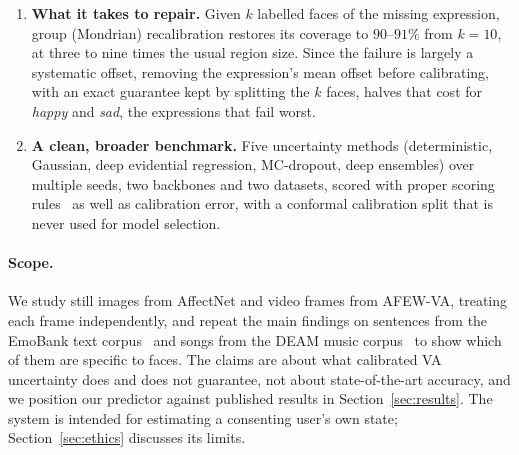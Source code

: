 \begin{enumerate}
        contempt looks like the happy and neutral faces the model has seen. This
        is a concrete, reproducible instance of the limits of distribution-free
        inference~\cite{barber2021limits} in affect.
  \item \textbf{What it takes to repair.} Given $k$ labelled faces of the
        missing expression, group (Mondrian) recalibration restores its
        coverage to $90$--$91\%$ from $k=10$, at three to nine times the usual
        region size. Since the failure is largely a systematic offset, removing
        the expression's mean offset before calibrating, with an exact guarantee
        kept by splitting the $k$ faces, halves that cost for \emph{happy} and
        \emph{sad}, the expressions that fail worst.
  \item \textbf{A clean, broader benchmark.} Five uncertainty methods
        (deterministic, Gaussian, deep evidential regression, MC-dropout, deep
        ensembles) over multiple seeds, two backbones and two datasets, scored
        with proper scoring rules~\cite{gneiting2007strictly} as well as
        calibration error, with a conformal calibration split that is never used
        for model selection.
\end{enumerate}

\paragraph{Scope.} We study still images from AffectNet and video frames from
AFEW-VA, treating each frame independently, and repeat the main findings on
sentences from the EmoBank text corpus~\cite{buechel2017emobank} and songs
from the DEAM music corpus~\cite{aljanaki2017deam} to show which of them are
specific to faces. The claims are about what
calibrated VA uncertainty does and does not guarantee, not about
state-of-the-art accuracy, and we position our predictor against published
results in Section~\ref{sec:results}. The system is intended for estimating a
consenting user's own state; Section~\ref{sec:ethics} discusses its limits.
